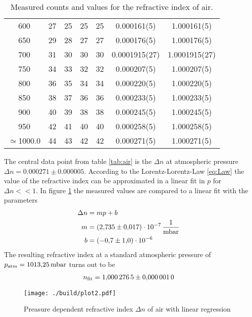 \begin{table}[H]
\begin{tabular}{S[table-format=3.0] S S S S S[table-format = 1.9(2)] S[table-format = 1.9(2)]}
		600                        & 27                                     & 25    & 25    & 25    & 0.000161(5)     & 1.000161(5)     \\
		650                        & 29                                     & 28    & 27    & 27    & 0.000176(5)     & 1.000176(5)     \\
		700                        & 31                                     & 30    & 30    & 30    & 0.0001915(27)   & 1.0001915(27)   \\
		750                        & 34                                     & 33    & 32    & 32    & 0.000207(5)     & 1.000207(5)     \\
		800                        & 36                                     & 35    & 34    & 34    & 0.000220(5)     & 1.000220(5)     \\
		850                        & 38                                     & 37    & 36    & 36    & 0.000233(5)     & 1.000233(5)     \\
		900                        & 40                                     & 39    & 38    & 38    & 0.000245(5)     & 1.000245(5)     \\
		950                        & 42                                     & 41    & 40    & 40    & 0.000258(5)     & 1.000258(5)     \\
		{$\simeq $1000.0}          & 44                                     & 43    & 42    & 42    & 0.000271(5)     & 1.000271(5)     \\
		\bottomrule
	\end{tabular}
	\caption{Measured counts and values for the refractive index of air.}\label{tab:air}
\end{table}

The central data point from table \eqref{tab:air} is the $\Delta n$ at
atmospheric pressure $\Delta n = 0.000271\pm0.000005$. According to the
Lorentz-Lorentz-Law \eqref{eq:Law} the value of the refractive index can be approximated in a
linear fit in $p$ for $\Delta n << 1$. In figure \ref{fig:air} the measured values are
compared to a linear fit with the parameters
\begin{align}
	\Delta n & = mp +b                               \\
	m        & = \qty{2.735(17)d-07}{\per\milli\bar} \\
	b        & = \num{-0.7(1.0)d-06}
\end{align}
The resulting refractive index at a standard atmospheric pressure of
$p_\t{atm}=\qty{1013.25}{\milli\bar}$ turns out to be
\begin{align}
	n_\t{fit} = \num{1.0002765 (10)}
\end{align}

\begin{figure}
	\centering
	\texttt{[image: ./build/plot2.pdf]}
	\caption{Preasure dependent refractive index $\Delta n$ of air with linear regression}\label{fig:air}
\end{figure}

